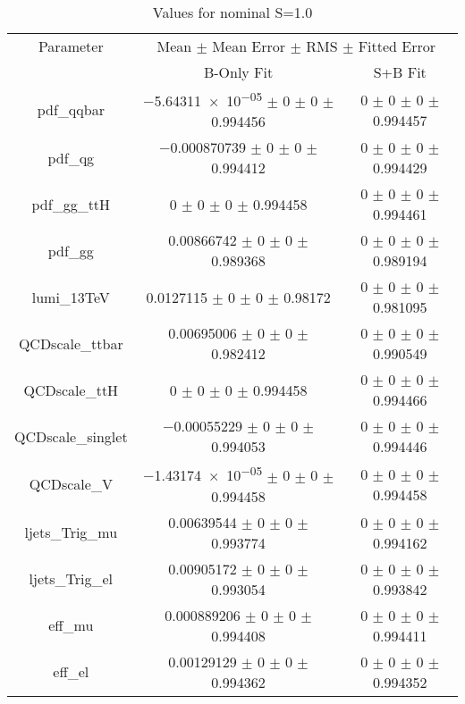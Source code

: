 \begin{table}
\centering
\caption{Values for nominal S=1.0}
\begin{tabular}{ccc}
\toprule
Parameter 	& \multicolumn{2}{c}{Mean $\pm$ Mean Error $\pm$ RMS $\pm$ Fitted Error}\\
 	& B-Only Fit & S+B Fit\\
\midrule
pdf\_qqbar 	& \num{-5.64311e-05} $\pm$ \num{0} $\pm$ \num{0} $\pm$ \num{0.994456} 	& \num{0} $\pm$ \num{0} $\pm$ \num{0} $\pm$ \num{0.994457}\\
pdf\_qg 	& \num{-0.000870739} $\pm$ \num{0} $\pm$ \num{0} $\pm$ \num{0.994412} 	& \num{0} $\pm$ \num{0} $\pm$ \num{0} $\pm$ \num{0.994429}\\
pdf\_gg\_ttH 	& \num{0} $\pm$ \num{0} $\pm$ \num{0} $\pm$ \num{0.994458} 	& \num{0} $\pm$ \num{0} $\pm$ \num{0} $\pm$ \num{0.994461}\\
pdf\_gg 	& \num{0.00866742} $\pm$ \num{0} $\pm$ \num{0} $\pm$ \num{0.989368} 	& \num{0} $\pm$ \num{0} $\pm$ \num{0} $\pm$ \num{0.989194}\\
lumi\_13TeV 	& \num{0.0127115} $\pm$ \num{0} $\pm$ \num{0} $\pm$ \num{0.98172} 	& \num{0} $\pm$ \num{0} $\pm$ \num{0} $\pm$ \num{0.981095}\\
QCDscale\_ttbar 	& \num{0.00695006} $\pm$ \num{0} $\pm$ \num{0} $\pm$ \num{0.982412} 	& \num{0} $\pm$ \num{0} $\pm$ \num{0} $\pm$ \num{0.990549}\\
QCDscale\_ttH 	& \num{0} $\pm$ \num{0} $\pm$ \num{0} $\pm$ \num{0.994458} 	& \num{0} $\pm$ \num{0} $\pm$ \num{0} $\pm$ \num{0.994466}\\
QCDscale\_singlet 	& \num{-0.00055229} $\pm$ \num{0} $\pm$ \num{0} $\pm$ \num{0.994053} 	& \num{0} $\pm$ \num{0} $\pm$ \num{0} $\pm$ \num{0.994446}\\
QCDscale\_V 	& \num{-1.43174e-05} $\pm$ \num{0} $\pm$ \num{0} $\pm$ \num{0.994458} 	& \num{0} $\pm$ \num{0} $\pm$ \num{0} $\pm$ \num{0.994458}\\
ljets\_Trig\_mu 	& \num{0.00639544} $\pm$ \num{0} $\pm$ \num{0} $\pm$ \num{0.993774} 	& \num{0} $\pm$ \num{0} $\pm$ \num{0} $\pm$ \num{0.994162}\\
ljets\_Trig\_el 	& \num{0.00905172} $\pm$ \num{0} $\pm$ \num{0} $\pm$ \num{0.993054} 	& \num{0} $\pm$ \num{0} $\pm$ \num{0} $\pm$ \num{0.993842}\\
eff\_mu 	& \num{0.000889206} $\pm$ \num{0} $\pm$ \num{0} $\pm$ \num{0.994408} 	& \num{0} $\pm$ \num{0} $\pm$ \num{0} $\pm$ \num{0.994411}\\
eff\_el 	& \num{0.00129129} $\pm$ \num{0} $\pm$ \num{0} $\pm$ \num{0.994362} 	& \num{0} $\pm$ \num{0} $\pm$ \num{0} $\pm$ \num{0.994352}\\

\end{tabular}
\end{table}
